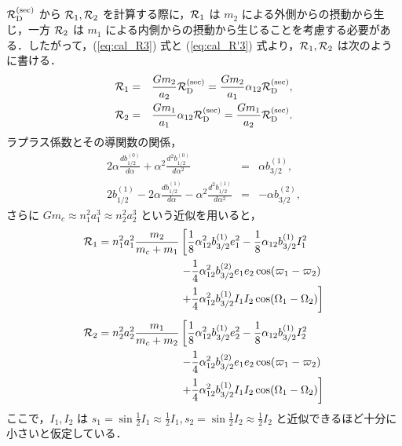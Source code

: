 \documentclass[11pt,a4paper,oneside,onecolumn]{jarticle}
\begin{document}
${\cal R}_{\rm D}^{\rm (sec)}$ から ${\cal R}_1, {\cal R}_2$ を計算する際に，${\cal R}_1$ は $m_2$ による外側からの摂動から生じ，一方 ${\cal R}_2$ は $m_1$ による内側からの摂動から生じることを考慮する必要がある．したがって，(\ref{eq:cal_R3}) 式と (\ref{eq:cal_R'3}) 式より，${\cal R}_1, {\cal R}_2$ は次のように書ける．
\begin{eqnarray}
{\cal R}_1 & = & \frac{G m_2}{a_2} {\cal R}_{\rm D}^{\rm (sec)} = \frac{G m_2}{a_1} \alpha_{12} {\cal R}_{\rm D}^{\rm (sec)}, \\ \label{}
{\cal R}_2 & = & \frac{G m_1}{a_1} \alpha_{12} {\cal R}_{\rm D}^{\rm (sec)} = \frac{G m_1}{a_2} {\cal R}_{\rm D}^{\rm (sec)}. \label{}
\end{eqnarray}
ラプラス係数とその導関数の関係，
\begin{eqnarray}
2 \alpha \frac{d b_{1/2}^{(0)}}{d \alpha} + \alpha^2 \frac{d^2 b_{1/2}^{(0)}}{d \alpha^2} & = & \alpha b_{3/2}^{(1)}, \\ \label{}
2 b_{1/2}^{(1)} - 2 \alpha \frac{d b_{1/2}^{(1)}}{d \alpha} - \alpha^2 \frac{d^2 b_{1/2}^{(1)}}{d \alpha^2} & = & - \alpha b_{3/2}^{(2)}, \label{}
\end{eqnarray}
さらに $G m_c \approx n_1^2 a_1^3 \approx n_2^2 a_2^3$ という近似を用いると，
\begin{equation}
\begin{split}
{\cal R}_1 = n_1^2 a_1^2 \frac{m_2}{m_c + m_1} & \left[ \frac{1}{8} \alpha_{12}^2 b_{3/2}^{(1)} e_1^2 - \frac{1}{8} \alpha_{12} b_{3/2}^{(1)} I_1^2 \right. \\
& \left. - \frac{1}{4} \alpha_{12}^2 b_{3/2}^{(2)} e_1 e_2 \cos (\varpi_1 - \varpi_2) \right. \\
& \left. + \frac{1}{4} \alpha_{12}^2 b_{3/2}^{(1)} I_1 I_2 \cos (\Omega_1 - \Omega_2) \right] \\
\end{split} \label{}
\end{equation}
\begin{equation}
\begin{split}
{\cal R}_2 = n_2^2 a_2^2 \frac{m_1}{m_c + m_2} & \left[ \frac{1}{8} \alpha_{12}^2 b_{3/2}^{(1)} e_2^2 - \frac{1}{8} \alpha_{12} b_{3/2}^{(1)} I_2^2 \right. \\
& \left. - \frac{1}{4} \alpha_{12}^2 b_{3/2}^{(2)} e_1 e_2 \cos (\varpi_1 - \varpi_2) \right. \\
& \left. + \frac{1}{4} \alpha_{12}^2 b_{3/2}^{(1)} I_1 I_2 \cos (\Omega_1 - \Omega_2) \right] \\
\end{split} \label{}
\end{equation}
ここで，$I_1, I_2$ は $s_1 = \sin \frac{1}{2} I_1 \approx \frac{1}{2} I_1, s_2 = \sin \frac{1}{2} I_2 \approx \frac{1}{2} I_2$ と近似できるほど十分に小さいと仮定している．
\end{document}
